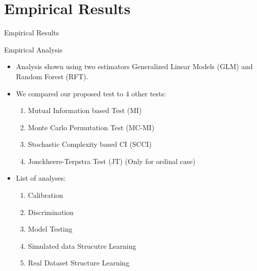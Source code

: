 \documentclass{beamer}
\begin{document}
\section{Empirical Results}
\begin{frame}
	\begin{center} \Huge{Empirical Results} \end{center}
\end{frame}
\begin{frame}{Empirical Analysis}
	\begin{itemize}
		\item Analysis shown using two estimators Generalized Linear Models (GLM) and Random Forest (RFT).
		\item We compared our proposed test to 4 other tests:
			\begin{enumerate}
				\item Mutual Information based Test (MI)
				\item Monte Carlo Permutation Test (MC-MI)
				\item Stochastic Complexity based CI (SCCI)
				\item Jonckheere-Terpstra Test (JT) (Only for ordinal case)
			\end{enumerate}
		\item List of analyses:
			\begin{enumerate}
				\item Calibration
				\item Discrimination
				\item Model Testing
				\item Simulated data Strucutre Learning
				\item Real Dataset Structure Learning
			\end{enumerate}

	\end{itemize}
\end{frame}
\end{document}
